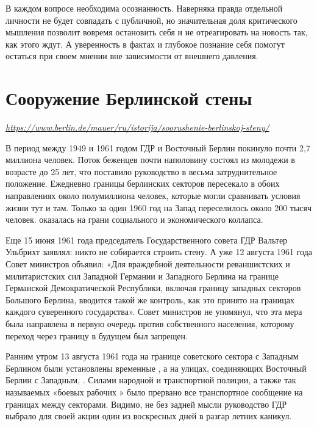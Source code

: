 В каждом вопросе необходима осознанность. Наверняка правда отдельной личности не будет совпадать с публичной, но значительная доля критического мышления позволит вовремя остановить себя и не отреагировать на новость так, как этого ждут. А уверенность в фактах и глубокое познание себя помогут остаться при своем мнении вне зависимости от внешнего давления.



\clearpage

\section{Сооружение Берлинской стены}

\textit{\url{https://www.berlin.de/mauer/ru/istorija/soorushenie-berlinskoj-steny/}}

В период между 1949 и 1961 годом ГДР и Восточный Берлин покинуло почти 2,7 миллиона человек. Поток беженцев почти наполовину состоял из молодежи в возрасте до 25 лет, что поставило руководство  в весьма затруднительное положение. Ежедневно границы берлинских секторов пересекало в обоих направлениях около полумиллиона человек, которые могли сравнивать условия жизни тут и там. Только за один 1960 год на Запад переселилось около 200 тысяч человек.  оказалась на грани социального и экономического коллапса.

Еще 15 июня 1961 года председатель Государственного совета ГДР Вальтер Ульбрихт заявлял: никто не собирается строить стену. А уже 12 августа 1961 года Совет министров объявил: «Для  враждебной деятельности реваншистских и милитаристских сил Западной Германии и Западного Берлина на границе Германской Демократической Республики, включая границу западных секторов Большого Берлина, вводится такой же контроль, как это принято на границах каждого суверенного государства». Совет министров не упомянул, что эта мера была направлена в первую очередь против собственного населения, которому переход через границу в будущем был запрещен.

Ранним утром 13 августа 1961 года на границе советского сектора с Западным Берлином были установлены временные , а на улицах, соединяющих Восточный Берлин с Западным,  . Силами  народной и транспортной полиции, а также так называемых «боевых рабочих » было прервано все транспортное сообщение на границах между секторами. Видимо, не без задней мысли руководство ГДР выбрало для своей акции один из воскресных дней в разгар летних каникул.

